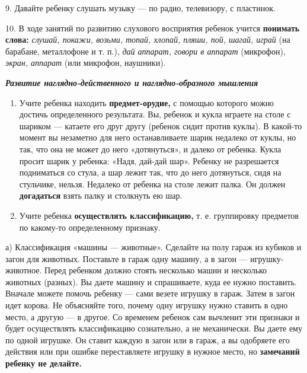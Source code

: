 \documentclass{book}
\renewcommand{\emph}[1]{\textit{#1}}
\begin{document}
9. Давайте ребенку слушать музыку --- по радио, телевизору, с пластинок.

10. В ходе занятий по развитию слухового восприятия ребенок учится
\textbf{понимать слова:} \emph{слушай, покажи, возьми, топай, хлопай,
пляши, пой, шагай, играй} (на барабане, металлофоне и т. п.), \emph{дай
аппарат, говори в аппарат} (микрофон), \emph{экран, аппарат} (или
микрофон, наушники).

\emph{\textbf{Развитие наглядно-действенного и наглядно-образного
мышления}}


\begin{enumerate}
\def\labelenumi{\arabic{enumi}.}
\item
  
  Учите ребенка находить \textbf{предмет-орудие,} с помощью которого
  можно достичь определенного результата. Вы, ребенок и кукла играете на
  столе с шариком --- катаете его друг другу (ребенок сидит против
  куклы). В какой-то момент вы незаметно для него останавливаете шарик
  недалеко от куклы, но так, что она не может до него «дотянуться», и
  далеко от ребенка. Кукла просит шарик у ребенка: «Надя, дай-дай шар».
  Ребенку не разрешается подниматься со стула, а шар лежит так, что до
  него дотянуться, сидя на стульчике, нельзя. Недалеко от ребенка на
  столе лежит палка. Он должен \textbf{догадаться} взять палку и
  столкнуть ею шар.
  
\item
  
  Учите ребенка \textbf{осуществлять классификацию,} т. е. группировку
  предметов по какому-то определенному признаку.
  
\end{enumerate}


а) Классификация «машины --- животные». Сделайте на полу гараж из
кубиков и загон для животных. Поставьте в гараж одну машину, а в загон
--- игрушку-животное. Перед ребенком должно стоять несколько машин и
несколько животных (разных). Вы даете машину и спрашиваете, куда ее
нужно поставить. Вначале можете помочь ребенку --- сами везете игрушку в
гараж. Затем в загон идет корова. Не объясняйте того, почему одну
игрушку нужно ставить в одно место, а другую --- в другое. Со временем
ребенок сам вычленит эти признаки и будет осуществлять классификацию
сознательно, а не механически. Вы даете ему по одной игрушке. Он ставит
каждую в загон или в гараж, а вы одобряете его действия или при ошибке
переставляете игрушку в нужное место, но \textbf{замечаний ребенку не
делайте.}
\end{document}
